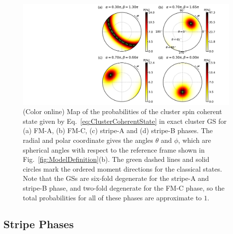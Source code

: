 \documentclass[aps,prb,reprint,amsfonts,amsmath,amssymb,showpacs,groupedaddress,superscriptaddress]{revtex4-1}
\begin{document}
\begin{figure}
    \centering
    \includegraphics[width=\columnwidth]{fig/Probabilities.pdf}
    \caption{\label{fig:Proabilities}(Color online) Map of the probabilities of the cluster spin coherent state given by Eq.~\eqref{eq:ClusterCoherentState} in exact cluster GS for (a) FM-A, (b) FM-C, (c) stripe-A and (d) stripe-B phases. The radial and polar coordinate gives the angles $\theta$ and $\phi$, which are spherical angles with respect to the reference frame shown in Fig.~\ref{fig:ModelDefinition}(b). The green dashed lines and solid circles mark the ordered moment directions for the classical states. Note that the GSs are six-fold degenerate for the stripe-A and stripe-B phase, and two-fold degenerate for the FM-C phase, so the total probabilities for all of these phases are approximate to $1$. }
\end{figure}

\subsection{\label{subsec:StripePhases}Stripe Phases}
\end{document}
